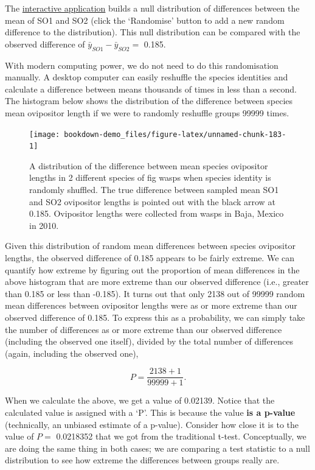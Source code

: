 \documentclass[
]{scrbook}
\begin{document}
The \href{https://bradduthie.shinyapps.io/randomisation/}{interactive application} builds a null distribution of differences between the mean of SO1 and SO2 (click the `Randomise' button to add a new random difference to the distribution).
This null distribution can be compared with the observed difference of \(\bar{y}_{SO1} - \bar{y}_{SO2} =\) 0.185.

With modern computing power, we do not need to do this randomisation manually.
A desktop computer can easily reshuffle the species identities and calculate a difference between means thousands of times in less than a second.
The histogram below shows the distribution of the difference between species mean ovipositor length if we were to randomly reshuffle groups 99999 times.

\begin{figure}
\texttt{[image: bookdown-demo\_files/figure-latex/unnamed-chunk-183-1]} \caption{A distribution of the difference between mean species ovipositor lengths in 2 different species of fig wasps when species identity is randomly shuffled. The true difference between sampled mean SO1 and SO2 ovipositor lengths is pointed out with the black arrow at 0.185. Ovipositor lengths were collected from wasps in Baja, Mexico in 2010.}\label{fig:unnamed-chunk-183}
\end{figure}

Given this distribution of random mean differences between species ovipositor lengths, the observed difference of 0.185 appears to be fairly extreme.
We can quantify how extreme by figuring out the proportion of mean differences in the above histogram that are more extreme than our observed difference (i.e., greater than 0.185 or less than -0.185).
It turns out that only 2138 out of 99999 random mean differences between ovipositor lengths were as or more extreme than our observed difference of 0.185.
To express this as a probability, we can simply take the number of differences as or more extreme than our observed difference (including the observed one itself), divided by the total number of differences (again, including the observed one),

\[P = \frac{2138 + 1}{99999 + 1}.\]

When we calculate the above, we get a value of 0.02139.
Notice that the calculated value is assigned with a `P'.
This is because the value \textbf{is a p-value} (technically, an unbiased estimate of a p-value). Consider how close it is to the value of \(P =\) 0.0218352 that we got from the traditional t-test.
Conceptually, we are doing the same thing in both cases; we are comparing a test statistic to a null distribution to see how extreme the differences between groups really are.
\end{document}
